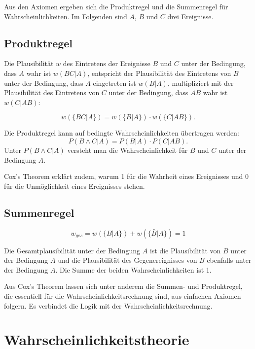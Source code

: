 \documentclass[]{dsadokumentation}
\begin{document}
Aus den Axiomen ergeben sich die Produktregel und die Summenregel für Wahrscheinlichkeiten. Im Folgenden sind $A$, $B$ und $C$ drei Ereignisse.

\subsection{Produktregel}

Die Plausibilität $w$ des Eintretens der Ereignisse $B$ und $C$ unter der Bedingung, dass $A$ wahr ist $w(BC|A)$,
entspricht der Plausibilität des Eintretens von $B$ unter der Bedingung, dass $A$ eingetreten ist $w(B|A)$,
multipliziert mit der Plausibilität des Eintretens von $C$ unter der Bedingung, dass $AB$ wahr ist $w(C|AB)$:

\begin {displaymath}
w(\{BC|A\})=w(\{B|A\})\cdot w(\{C|AB\}) .
\end{displaymath}

\noindent Die Produktregel kann auf bedingte Wahrscheinlichkeiten übertragen werden:
\begin {displaymath}
P(B \wedge C|A) = P(B|A)\cdot P(C|AB).
\end{displaymath}
Unter $P(B \wedge C|A)$ versteht man die Wahrscheinlichkeit für $B$ und $C$ unter der Bedingung $A$.

Cox's Theorem erklärt zudem, warum 1 für die Wahrheit eines Ereignisses und 0 für die Unmöglichkeit eines Ereignisses stehen.

\subsection{Summenregel}
\begin{displaymath}
w_{ges}=w(\{B|A\}) + w(\{\bar{B}|A\})= 1
\end{displaymath}

Die Gesamtplausibilität unter der Bedingung $A$ ist die Plausibilität von $B$ unter der Bedingung $A$
und die Plausibilität des Gegenereignisses von $B$ ebenfalls unter der Bedingung $A$. Die Summe der beiden Wahrscheinlichkeiten ist 1.

Aus Cox's Theorem lassen sich unter anderem die Summen- und Produktregel, die essentiell für die Wahrscheinlichkeitsrechnung sind, aus einfachen Axiomen folgern.
Es verbindet die Logik mit der Wahrscheinlichkeitsrechnung.

\section{Wahrscheinlichkeitstheorie}\label{k4.2.bayes}
\end{document}
